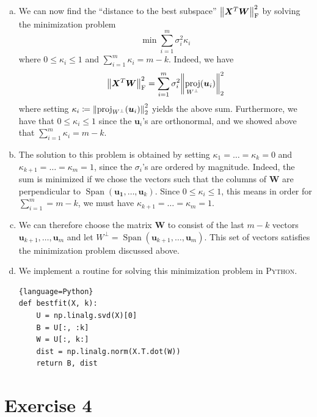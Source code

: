 \documentclass[article, a4paper, oneside, 12pt]{memoir}
\DeclareMathOperator{\proj}{proj}
\DeclareMathOperator{\Span}{Span}
\newcommand{\mat}[1]{\bm{#1}}
\newcommand{\frob}[1]{\norm{#1}_{\mathrm{F}}}
\begin{document}
\begin{enumerate}[a)]
    \item We can now find the ``distance to the best subspace'' \(
        \frob{\mat{X}^T\mat{W}}^2 \) by solving the minimization problem
        \begin{equation}
            \min \sum_{i=1}^m \sigma_i^2 \kappa_i
        \end{equation}
        where \( 0 \leq \kappa_i \leq 1 \) and \( \sum_{i=1}^m \kappa_i = m - k \).
        Indeed, we have
        \begin{equation}
            \frob{\mat{X}^T\mat{W}}^2 = \sum_{i = 1}^m \sigma_i^2 \norm{\proj_{W^\perp}(\mat{u}_i)}^2_2
        \end{equation}
        where setting \( \kappa_i \coloneqq \norm{\proj_{W^\perp}(\mat{u}_i)}_2^2 \)
        yields the above sum. Furthermore, we have that \( 0 \leq \kappa_i \leq 1 \)
        since the \( \mat{u}_i\)'s are orthonormal, and we showed above that \(
        \sum_{i=1}^m \kappa_i = m - k \).

\item The solution to this problem is obtained by setting \( \kappa_1 = \ldots
    = \kappa_k = 0 \) and \( \kappa_{k+1} = \ldots = \kappa_{m} = 1 \), since
    the \( \sigma_i\)'s are ordered by magnitude. Indeed, the sum is minimized
    if we chose the vectors such that the columns of \( \mat{W} \) are
    perpendicular to \( \Span({\mat{u_1}, \ldots, \mat{u}_k}) \). Since \( 0
    \leq \kappa_i \leq 1 \), this means in order for \( \sum_{i = 1}^m = m - k
    \), we must have \( \kappa_{k+1} = \ldots = \kappa_{m} = 1\).

\item We can therefore choose the matrix \( \mat{W} \) to consist of the last
    \( m - k \) vectors \( \mat{u}_{k+1}, \ldots, \mat{u}_{m} \) and let \(
    W^\perp = \Span(\mat{u}_{k+1}, \ldots, \mat{u}_m) \). This set of vectors
    satisfies the minimization problem discussed above.  
    
\item We implement a routine for solving this minimization problem in
    \textsc{Python}. 

\begin{lstlisting}{language=Python}
def bestfit(X, k):
    U = np.linalg.svd(X)[0]
    B = U[:, :k]
    W = U[:, k:]
    dist = np.linalg.norm(X.T.dot(W))
    return B, dist
\end{lstlisting}
\end{enumerate}
\chapter*{Exercise 4}
\end{document}
